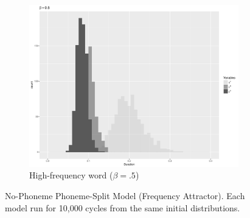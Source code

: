 \begin{figure}[H]
\begin{subfigure}[t]{.3\textwidth}
        \includegraphics[width=\linewidth]{figures/SpeakingRateFrequencybeta5.pdf}
        \caption{High-frequency word ($\beta=.5$)}
    \end{subfigure}



\caption{\label{fig:NasalizationModel1}No-Phoneme Phoneme-Split Model (Frequency
Attractor). Each model run for 10,000 cycles from the same initial
distributions. }
\end{figure}

